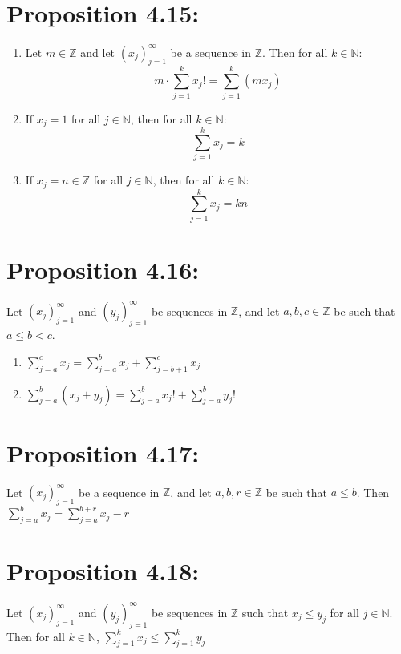 \section*{Proposition 4.15:}
\begin{enumerate}
    \item Let $m \in \mathbb{Z}$ and let $(x_j)_{j=1}^{\infty}$ be a sequence in $\mathbb{Z}$. Then for all $k \in \mathbb{N}$:
    \[ m \cdot \sum_{j=1}^k x_j! = \sum_{j=1}^k (mx_j) \]
    \item If $x_j = 1$ for all $j \in \mathbb{N}$, then for all $k \in \mathbb{N}$:
    \[ \sum_{j=1}^k x_j = k \]
    \item If $x_j = n \in \mathbb{Z}$ for all $j \in \mathbb{N}$, then for all $k \in \mathbb{N}$:
    \[ \sum_{j=1}^k x_j = kn \]
\end{enumerate}


\section*{Proposition 4.16:}
Let $(x_j)_{j=1}^{\infty}$ and $(y_j)_{j=1}^{\infty}$ be sequences in $\mathbb{Z}$, and let $a,b,c \in \mathbb{Z}$ be such that $a \leq b < c$.
\begin{enumerate}
    \item $\displaystyle\sum_{j=a}^{c} x_j = \displaystyle\sum_{j=a}^{b} x_j + \displaystyle\sum_{j=b+1}^{c} x_j$
    \item $\displaystyle\sum_{j=a}^{b} (x_j + y_j) = \displaystyle\sum_{j=a}^{b} x_j! + \displaystyle\sum_{j=a}^{b} y_j!$
\end{enumerate}

\section*{Proposition 4.17:}
Let $(x_j)_{j=1}^{\infty}$ be a sequence in $\mathbb{Z}$, and let $a,b, r \in \mathbb{Z}$ be such that $a \leq b$. Then
$\displaystyle\sum_{j=a}^{b} x_j = \displaystyle\sum_{j=a}^{b+r} x_j - r$

\section*{Proposition 4.18:}
Let $(x_j)_{j=1}^{\infty}$ and $(y_j)_{j=1}^{\infty}$ be sequences in $\mathbb{Z}$ such that $x_j \leq y_j$ for all $j \in \mathbb{N}$. Then for all $k \in \mathbb{N}$,
$\displaystyle\sum_{j=1}^{k} x_j \leq \displaystyle\sum_{j=1}^{k} y_j$

